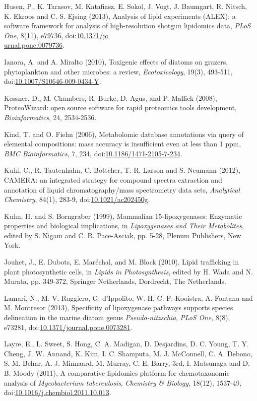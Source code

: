 \begin{singlespace}
{{Husen, P., K. Tarasov, M. Katafiasz, E. Sokol, J. Vogt, J. Baumgart, R. Nitsch, K. Ekroos and C. S. Ejsing (2013), Analysis of lipid experiments (ALEX): a software framework for analysis of high-resolution shotgun lipidomics data, \emph{PLoS One}, 8(11), e79736, doi:\href{http://dx.doi.org/10.1371/journal.pone.0079736}{10.1371/jo\\urnal.pone.0079736}.

Ianora, A. and A. Miralto (2010), Toxigenic effects of diatoms on grazers, phytoplankton and other microbes: a review, \emph{Ecotoxicology}, 19(3), 493-511, doi:\href{http://dx.doi.org/10.1007/S10646-009-0434-Y}{10.1007/S10646-009-0434-Y}.

Kessner, D., M. Chambers, R. Burke, D. Agus, and P. Mallick (2008), ProteoWizard: open source software for rapid proteomics tools development, \emph{Bioinformatics}, 24, 2534-2536.

Kind, T. and O. Fiehn (2006), Metabolomic database annotations via query of elemental compositions: mass accuracy is insufficient even at less than 1 ppm, \emph{BMC Bioinformatics}, 7, 234, doi:\href{http://dx.doi.org/10.1186/1471-2105-7-234}{10.1186/1471-2105-7-234}.

Kuhl, C., R. Tautenhahn, C. Bottcher, T. R. Larson and S. Neumann (2012), CAMERA: an integrated strategy for compound spectra extraction and annotation of liquid chromatography/mass spectrometry data sets, \emph{Analytical Chemistry}, 84(1), 283-9, doi:\href{http://dx.doi.org/10.1021/ac202450g}{10.1021/ac202450g}.

Kuhn, H. and S. Borngraber (1999), Mammalian 15-lipoxygenases: Enzymatic properties and biological implications, in \emph{Lipoxygenases and Their Metabolites}, edited by S. Nigam and C. R. Pace-Asciak, pp. 5-28, Plenum Publishers, New York.

Jouhet, J., E. Dubots, E. Mar\'{e}chal, and M. Block (2010), Lipid trafficking in plant photosynthetic cells, in \emph{Lipids in Photosynthesis}, edited by H. Wada and N. Murata, pp. 349-372, Springer Netherlands, Dordrecht, The Netherlands.

Lamari, N., M. V. Ruggiero, G. d'Ippolito, W. H. C. F. Kooistra, A. Fontana and M. Montresor (2013), Specificity of lipoxygenase pathways supports species delineation in the marine diatom genus \emph{Pseudo-nitzschia}, \emph{PLoS One,} 8(8), e73281, doi:\href{http://dx.doi.org/10.1371/journal.pone.0073281}{10.1371/journal.pone.0073281}.

Layre, E., L. Sweet, S. Hong, C. A. Madigan, D. Desjardins, D. C. Young, T. Y. Cheng, J. W. Annand, K. Kim, I. C. Shamputa, M. J. McConnell, C. A. Debono, S. M. Behar, A. J. Minnaard, M. Murray, C. E. Barry, 3rd, I. Matsunaga and D. B. Moody (2011), A comparative lipidomics platform for chemotaxonomic analysis of \emph{Mycobacterium tuberculosis}, \emph{Chemistry \& Biology,} 18(12), 1537-49, doi:\href{http://dx.doi.org/10.1016/j.chembiol.2011.10.013}{10.1016/j.chembiol.2011.10.013}.

}}
\end{singlespace}
